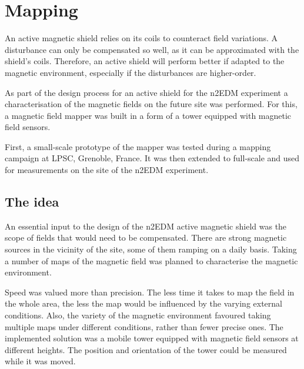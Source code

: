 \chapter{Mapping}
\label{ch:mapping}
An active magnetic shield relies on its coils to counteract field variations.
A disturbance can only be compensated so well, as it can be approximated with the shield's coils.
Therefore, an active shield will perform better if adapted to the magnetic environment, especially if the disturbances are higher-order.

As part of the design process for an active shield for the n2EDM experiment a characterisation of the magnetic fields on the future site was performed.
For this, a magnetic field mapper was built in a form of a tower equipped with magnetic field sensors.

First, a small-scale prototype of the mapper was tested during a mapping campaign at LPSC, Grenoble, France.
It was then extended to full-scale and used for measurements on the site of the n2EDM experiment.




\section{The idea}
An essential input to the design of the n2EDM active magnetic shield was the scope of fields that would need to be compensated.
There are strong magnetic sources in the vicinity of the site, some of them ramping on a daily basis.
Taking a number of maps of the magnetic field was planned to characterise the magnetic environment.

Speed was valued more than precision.
The less time it takes to map the field in the whole area, the less the map would be influenced by the varying external conditions.
Also, the variety of the magnetic environment favoured taking multiple maps under different conditions, rather than fewer precise ones.
The implemented solution was a mobile tower equipped with magnetic field sensors at different heights.
The position and orientation of the tower could be measured while it was moved.

